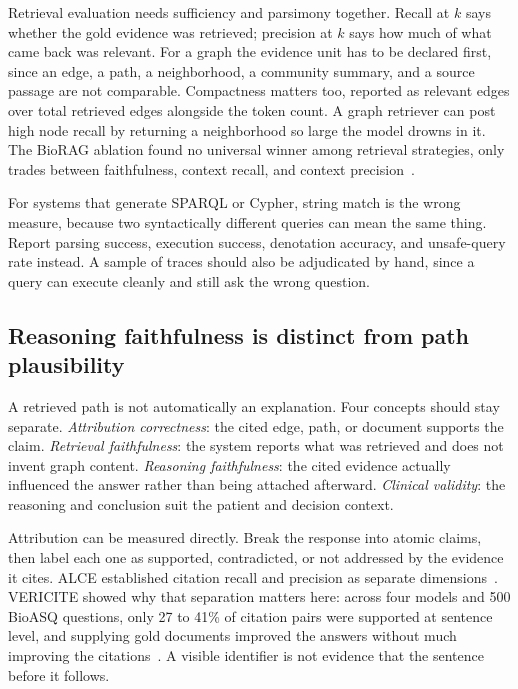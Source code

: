 Retrieval evaluation needs sufficiency and parsimony together. Recall at $k$ says whether the gold evidence was retrieved; precision at $k$ says how much of what came back was relevant. For a graph the evidence unit has to be declared first, since an edge, a path, a neighborhood, a community summary, and a source passage are not comparable. Compactness matters too, reported as relevant edges over total retrieved edges alongside the token count. A graph retriever can post high node recall by returning a neighborhood so large the model drowns in it. The BioRAG ablation found no universal winner among retrieval strategies, only trades between faithfulness, context recall, and context precision~\cite{bhojani2026biorag}.

For systems that generate SPARQL or Cypher, string match is the wrong measure, because two syntactically different queries can mean the same thing. Report parsing success, execution success, denotation accuracy, and unsafe-query rate instead. A sample of traces should also be adjudicated by hand, since a query can execute cleanly and still ask the wrong question.

\subsection{Reasoning faithfulness is distinct from path plausibility}

A retrieved path is not automatically an explanation. Four concepts should stay separate. \emph{Attribution correctness}: the cited edge, path, or document supports the claim. \emph{Retrieval faithfulness}: the system reports what was retrieved and does not invent graph content. \emph{Reasoning faithfulness}: the cited evidence actually influenced the answer rather than being attached afterward. \emph{Clinical validity}: the reasoning and conclusion suit the patient and decision context.

Attribution can be measured directly. Break the response into atomic claims, then label each one as supported, contradicted, or not addressed by the evidence it cites. ALCE established citation recall and precision as separate dimensions~\cite{gao2023alce}. VERICITE showed why that separation matters here: across four models and 500 BioASQ questions, only 27 to 41\% of citation pairs were supported at sentence level, and supplying gold documents improved the answers without much improving the citations~\cite{ma2026vericite}. A visible identifier is not evidence that the sentence before it follows.

